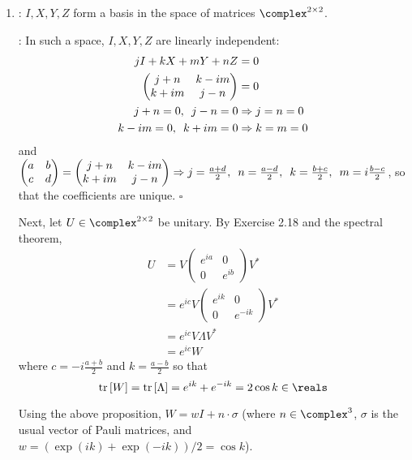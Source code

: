 \begingroup
\newcommand{\tr}[1]{\mathrm{tr} \left[ #1 \right]}
\newcommand{\re}[1]{\mathrm{Re} \left( #1 \right)}
\newcommand{\expo}[1]{\exp \left( #1 \right)}
\newcommand{\coso}[1]{\cos \left( #1 \right)}
\newcommand{\sino}[1]{\sin \left( #1 \right)}
%
\begin{enumerate}
\item {}: $I, X, Y, Z$ form a basis in the space of matrices $\complex^{2 \times 2}$.
%
\par \proof: In such a space, $I, X, Y, Z$ are linearly independent:
%
\begin{align*}
j I + k X + m Y + n Z &= 0 \\
\begin{pmatrix} j + n & k - i m \\ k + i m & j - n \end{pmatrix} &= 0 \\
j + n = 0, \enskip j - n = 0 &\Rightarrow j = n = 0 \\
k - i m = 0, \enskip k + i m = 0 &\Rightarrow k = m = 0
\end{align*}
%
and $\begin{pmatrix} a & b \\ c & d \end{pmatrix} = \begin{pmatrix} j + n & k - i m \\ k + i m & j - n \end{pmatrix} \Rightarrow j = \frac{a+d}{2}, \enskip n = \frac{a-d}{2}, \enskip k = \frac{b+c}{2}, \enskip m = i \frac{b-c}{2}$, so that the coefficients are unique. \hfill $\square$
%
\par Next, let $U \in \complex^{2 \times 2}$ be unitary.
%
By Exercise 2.18 and the spectral theorem,
%
\begin{align*}
U &= V \begin{pmatrix} e^{ia} & 0 \\ 0 & e^{ib} \end{pmatrix} V^* \\
&= e^{ic} V \begin{pmatrix} e^{ik} & 0 \\ 0 & e^{-i k} \end{pmatrix} V^* \\
&= e^{ic} V \Lambda V^* \\
&= e^{ic} W
\end{align*}
%
where $c = -i\frac{a+b}{2}$ and $k = \frac{a-b}{2}$ so that
%
$$
\tr{W} = \tr{\Lambda} = e^{ik} + e^{-ik} = 2 \cos k \in \reals
$$
%
\par Using the above proposition, $W = w I + n \cdot \sigma$ (where $n \in \complex^3$, $\sigma$ is the usual vector of Pauli matrices, and $w = \left( \expo{ik} + \expo{-ik} \right) / 2 = \cos k$).

\end{enumerate}
